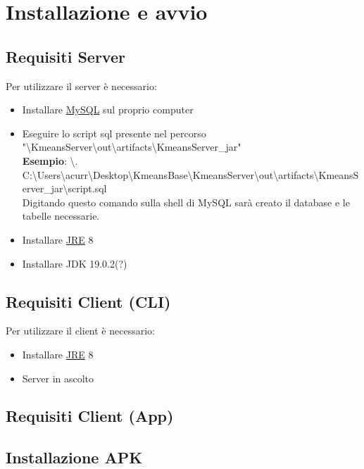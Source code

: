 \section{Installazione e avvio}
\subsection{Requisiti Server}
\noindent Per utilizzare il server è necessario:
\begin{itemize}[label=-]
  \item Installare \href{https://dev.mysql.com/downloads/installer/}{MySQL} sul proprio computer
  \item Eseguire lo script sql presente nel percorso "\textbackslash KmeansServer\textbackslash out\textbackslash artifacts\textbackslash KmeansServer\_jar"
  \\ \textbf{Esempio}: \textbackslash . C:\textbackslash Users\textbackslash acurr\textbackslash Desktop\textbackslash KmeansBase\textbackslash KmeansServer\textbackslash out\textbackslash artifacts\textbackslash KmeansServer\_jar\textbackslash script.sql
  \\ Digitando questo comando sulla shell di MySQL sarà creato il database e le tabelle necessarie.
  \item Installare \href{https://www.oracle.com/technetwork/java/javase/downloads/jre8-downloads-2133155.html}{JRE} 8
  \item Installare JDK 19.0.2(?)
\end{itemize}

\subsection{Requisiti Client (CLI)}
\noindent Per utilizzare il client è necessario:
\begin{itemize}[label=-]
  \item Installare \href{https://www.oracle.com/technetwork/java/javase/downloads/jre8-downloads-2133155.html}{JRE} 8  
  \item Server in ascolto
\end{itemize}

\subsection{Requisiti Client (App)}
\subsection{Installazione APK}

